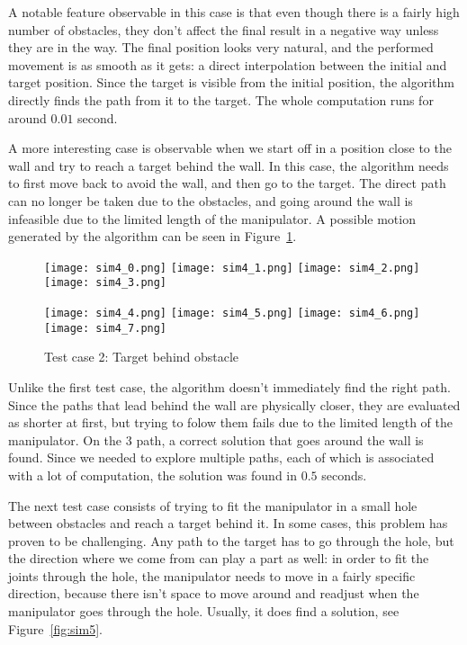 A notable feature observable in this case is that even though there is a fairly high number of obstacles, they don't affect the final result in a negative way unless they are in the way. The final position looks very natural, and the performed movement is as smooth as it gets: a direct interpolation between the initial and target position. Since the target is visible from the initial position, the algorithm directly finds the path from it to the target. The whole computation runs for around $0.01$ second.

A more interesting case is observable when we start off in a position close to the wall and try to reach a target behind the wall. In this case, the algorithm needs to first move back to avoid the wall, and then go to the target. The direct path can no longer be taken due to the obstacles, and going around the wall is infeasible due to the limited length of the manipulator. A possible motion generated by the algorithm can be seen in Figure~\ref{fig:sim4}.

\begin{figure}[h]
  \centering
  \begin{minipage}{\textwidth}
    \texttt{[image: sim4\_0.png]}
    \texttt{[image: sim4\_1.png]}
    \texttt{[image: sim4\_2.png]}
    \texttt{[image: sim4\_3.png]}

    \texttt{[image: sim4\_4.png]}
    \texttt{[image: sim4\_5.png]}
    \texttt{[image: sim4\_6.png]}
    \texttt{[image: sim4\_7.png]}
  \end{minipage}
  \caption{Test case 2: Target behind obstacle}\label{fig:sim4}
\end{figure}

Unlike the first test case, the algorithm doesn't immediately find the right path. Since the paths that lead behind the wall are physically closer, they are evaluated as shorter at first, but trying to folow them fails due to the limited length of the manipulator. On the 3\rd{} path, a correct solution that goes around the wall is found. Since we needed to explore multiple paths, each of which is associated with a lot of computation, the solution was found in $0.5$ seconds.

The next test case consists of trying to fit the manipulator in a small hole between obstacles and reach a target behind it. In some cases, this problem has proven to be challenging.
Any path to the target has to go through the hole, but the direction where we come from can play a part as well: in order to fit the joints through the hole, the manipulator needs to move in a fairly specific direction, because there isn't space to move around and readjust when the manipulator goes through the hole. Usually, it does find a solution, see Figure~\ref{fig:sim5}.


